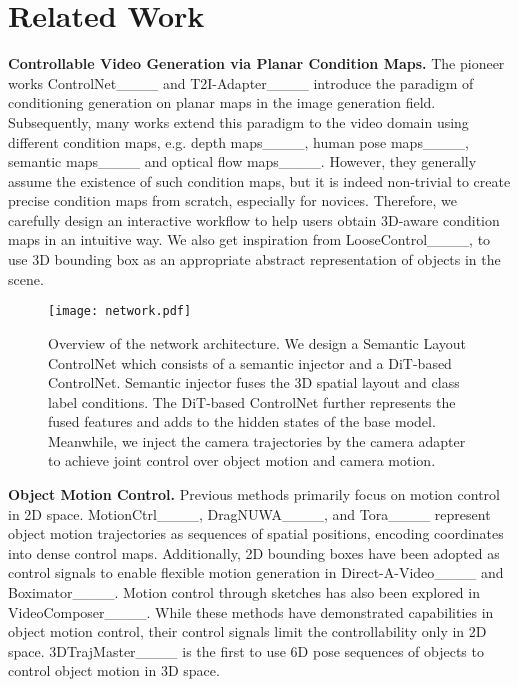\section{Related Work}
\label{sec:formatting}

\noindent\textbf{Controllable Video Generation via Planar Condition Maps.} The pioneer works ControlNet____ and T2I-Adapter____ introduce the paradigm of conditioning generation on planar maps in the image generation field. Subsequently, many works extend this paradigm to the video domain using different condition maps, e.g. depth maps____, human pose maps____, semantic maps____ and optical flow maps____. However, they generally assume the existence of such condition maps, but it is indeed non-trivial to create precise condition maps from scratch, especially for novices. Therefore, we carefully design an interactive workflow to help users obtain 3D-aware condition maps in an intuitive way. We also get inspiration from LooseControl____, to use 3D bounding box as an appropriate abstract representation of objects in the scene.



\begin{figure*}[!t]
  \centering
  \texttt{[image: network.pdf]}
  \vspace{-15pt}
  \caption{Overview of the network architecture. We design a Semantic Layout ControlNet which consists of a semantic injector and a DiT-based ControlNet. Semantic injector fuses the 3D spatial layout and class label conditions. The DiT-based ControlNet further represents the fused features and adds to the hidden states of the base model. Meanwhile, we inject the camera trajectories by the camera adapter to achieve joint control over object motion and camera motion.}
  \label{fig:network}
  \vspace{-4pt}  
\end{figure*}


\noindent\textbf{Object Motion Control.} Previous methods primarily focus on motion control in 2D space. MotionCtrl____, DragNUWA____, and Tora____ represent object motion trajectories as sequences of spatial positions, encoding coordinates into dense control maps. Additionally, 2D bounding boxes have been adopted as control signals to enable flexible motion generation in Direct-A-Video____ and Boximator____. Motion control through sketches has also been explored in VideoComposer____. 
While these methods have demonstrated capabilities in object motion control, their control signals limit the controllability only in 2D space. 3DTrajMaster____ is the first to use 6D pose sequences of objects to control object motion in 3D space.




